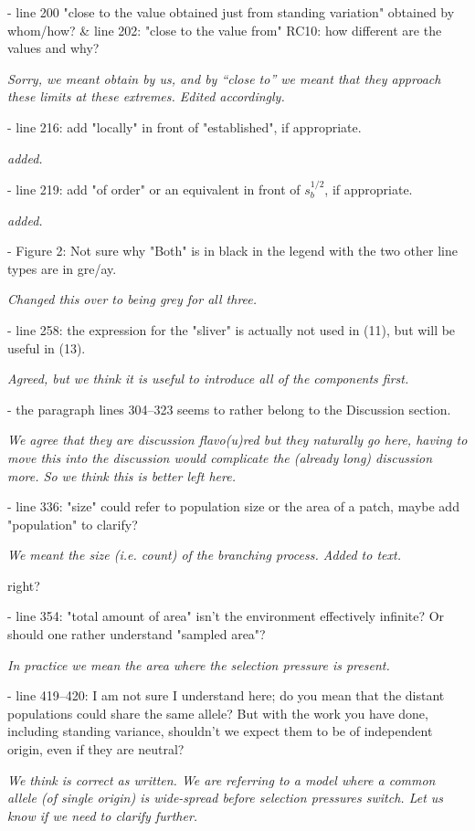 \documentclass[12pt,letterpaper]{article}
\newcommand{\gc}[1]{{ \color{red} #1}}
\newcommand{\response}[1]{\emph{ \color{blue} #1}}
\begin{document}
- line 200 "close to the value obtained just from standing variation" obtained by whom/how? \&  line 202: "close to the value from" RC10: how different are the values and why?


\response{Sorry, we meant obtain by us, and by ``close to'' we meant that they approach these limits at these extremes. Edited accordingly.}


- line 216: add "locally" in front of "established", if appropriate.

\response{added.}

- line 219: add "of order" or an equivalent in front of $s_b^{1/2}$, if appropriate.

\response{added.}

- Figure 2: Not sure why "Both" is in black in the legend with the two other line types are in gre/ay.

\response{Changed this over to being grey for all three.}

- line 258: the expression for the "sliver" is actually not used in (11), but will be useful in (13).

\response{Agreed, but we think it is useful to introduce all of the components first.}

- the paragraph lines 304--323 seems to rather belong to the Discussion section.

\response{We agree that they are discussion flavo(u)red but they naturally go here, having to move this into the discussion would complicate the (already long) discussion more. So we think this is better left here.}

- line 336: "size" could refer to population size or the area of a patch, maybe add "population" to clarify?

\response{We meant the size (i.e. count) of the branching process. Added to text.} 

\gc{right?}

- line 354: "total amount of area" isn't the environment effectively infinite? Or should one rather understand "sampled area"?

\response{In practice we mean the area where the selection pressure is present.}

- line 419--420: I am not sure I understand here; do you mean that the distant populations could share the same allele? But with the work you have done, including standing variance, shouldn't we expect them to be of independent origin, even if they are neutral?

\response{We think is correct as written. We are referring to a model where a common allele (of single origin) is wide-spread before selection pressures switch. Let us know if we need to clarify further.}
\end{document}
